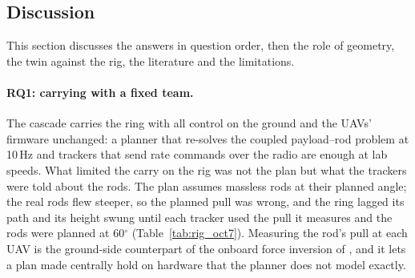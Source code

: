 
\subsection{Discussion}
\label{sec:discussion}

This section discusses the answers in question order, then the role of geometry, the twin against the
rig, the literature and the limitations.

\paragraph{RQ1: carrying with a fixed team.} The cascade carries the ring with all control on the ground and
the UAVs' firmware unchanged: a planner that re-solves the coupled payload--rod problem at 10\,Hz and trackers
that send rate commands over the radio are enough at lab speeds. What limited the carry on the rig was not the
plan but what the trackers were told about the rods. The plan assumes massless rods at their planned angle;
the real rods flew steeper, so the planned pull was wrong, and the ring lagged its path and its height swung
until each tracker used the pull it measures and the rods were planned at 60$^\circ$
(Table~\ref{tab:rig_oct7}). Measuring the rod's pull at each UAV is the ground-side counterpart of the onboard
force inversion of \cite{tudelft}, and it lets a plan made centrally hold on hardware that the planner does
not model exactly.

